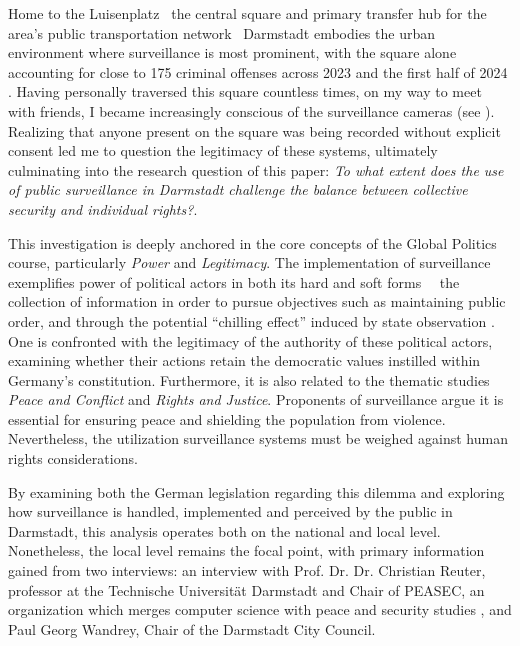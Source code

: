 \documentclass[12pt]{article}
\begin{document}
	Home to the Luisenplatz \textemdash\ the central square and primary transfer hub for the area's public transportation network \textemdash\ Darmstadt embodies the urban environment where surveillance is most prominent, with the square alone accounting for close to 175 criminal offenses across 2023 and the first half of 2024 \parencite{schonbein_weapon_2025}. Having personally traversed this square countless times, on my way to meet with friends, I became increasingly conscious of the surveillance cameras (see ). Realizing that anyone present on the square was being recorded without explicit consent led me to question the legitimacy of these systems, ultimately culminating into the research question of this paper: \textit{To what extent does the use of public surveillance in Darmstadt challenge the balance between collective security and individual rights?}.
	
	This investigation is deeply anchored in the core concepts of the Global Politics course, particularly \textit{Power} and \textit{Legitimacy}. The implementation of surveillance exemplifies power of political actors in both its hard and soft forms \parencite{courseCompanion2024}\ \textemdash\ the collection of information in order to pursue objectives such as maintaining public order, and through the potential ``chilling effect'' induced by state observation \parencite{murray2024}. One is confronted with the legitimacy of the authority of these political actors, examining whether their actions retain the democratic values instilled within Germany's constitution. Furthermore, it is also related to the thematic studies \textit{Peace and Conflict} and \textit{Rights and Justice}. Proponents of surveillance argue it is essential for ensuring peace and shielding the population from violence. Nevertheless, the utilization surveillance systems must be weighed against human rights considerations.
	
	By examining both the German legislation regarding this dilemma and exploring how surveillance is handled, implemented and perceived by the public in Darmstadt, this analysis operates both on the national and local level. Nonetheless, the local level remains the focal point, with primary information gained from two interviews: an interview with Prof. Dr. Dr. Christian Reuter, professor at the Technische Universität Darmstadt and Chair of PEASEC, an organization which merges computer science with peace and security studies \parencite{noauthor_peasec_2025}, and Paul Georg Wandrey, Chair of the Darmstadt City Council.
	
\end{document}
